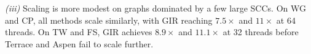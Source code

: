 \textit{(iii)} Scaling is more modest on graphs dominated by a few large SCCs.
On WG and CP, all methods scale similarly, with GIR reaching $7.5\times$ and $11\times$ at 64 threads.
On TW and FS, GIR achieves $8.9\times$ and $11.1\times$ at 32 threads before Terrace and Aspen fail to scale further.








%
